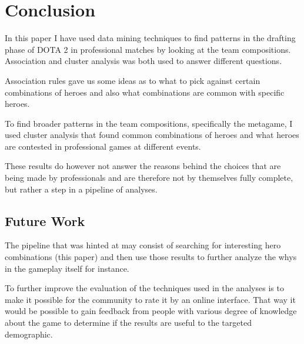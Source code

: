 \documentclass[result.tex]{subfiles}
\begin{document}
\section*{\centering Conclusion}

In this paper I have used data mining techniques to find patterns in the drafting phase of DOTA 2 in professional matches by looking at the team compositions. Association and cluster analysis was both used to answer different questions.

Association rules gave us some ideas as to what to pick against certain combinations of heroes and also what combinations are common with specific heroes.

To find broader patterns in the team compositions, specifically the metagame, I used cluster analysis that found common combinations of heroes and what heroes are contested in professional games at different events.

These results do however not answer the reasons behind the choices that are being made by professionals and are therefore not by themselves fully complete, but rather a step in a pipeline of analyses.

\subsection*{Future Work}

The pipeline that was hinted at may consist of searching for interesting hero combinations (this paper) and then use those results to further analyze the whys in the gameplay itself for instance.

To further improve the evaluation of the techniques used in the analyses is to make it possible for the community to rate it by an online interface. That way it would be possible to gain feedback from people with various degree of knowledge about the game to determine if the results are useful to the targeted demographic.
\end{document}
